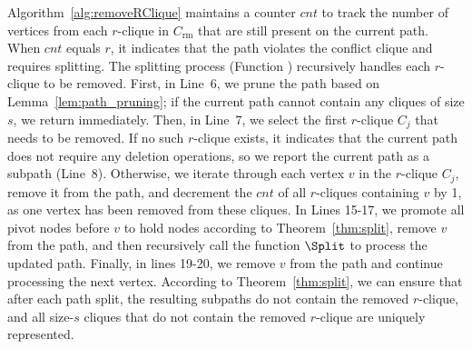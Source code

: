 Algorithm~\ref{alg:removeRClique} maintains a counter $cnt$ to track the number of vertices from each $r$-clique in $C_{\mathrm{rm}}$ that are still present on the current path. When $cnt$ equals $r$, it indicates that the path violates the conflict clique and requires splitting. The splitting process (Function \Split) recursively handles each $r$-clique to be removed.
First, in Line~6, we prune the path based on Lemma~\ref{lem:path_pruning}; if the current path cannot contain any cliques of size $s$, we return immediately.
Then, in Line~7, we select the first $r$-clique $C_j$ that needs to be removed.
If no such $r$-clique exists, it indicates that the current path does not require any deletion operations, so we report the current path as a subpath (Line~8).
Otherwise, we iterate through each vertex $v$ in the $r$-clique $C_j$, remove it from the path, and decrement the $cnt$ of all $r$-cliques containing $v$ by 1, as one vertex has been removed from these cliques.
In Lines 15-17, we promote all pivot nodes before $v$ to hold nodes according to Theorem~\ref{thm:split}, remove $v$ from the path, and then recursively call the function $\Split$ to process the updated path.
Finally, in lines 19-20, we remove $v$ from the path and continue processing the next vertex.
According to Theorem~\ref{thm:split}, we can ensure that after each path split, the resulting subpaths do not contain the removed $r$-clique, and all size-$s$ cliques that do not contain the removed $r$-clique are uniquely represented.



